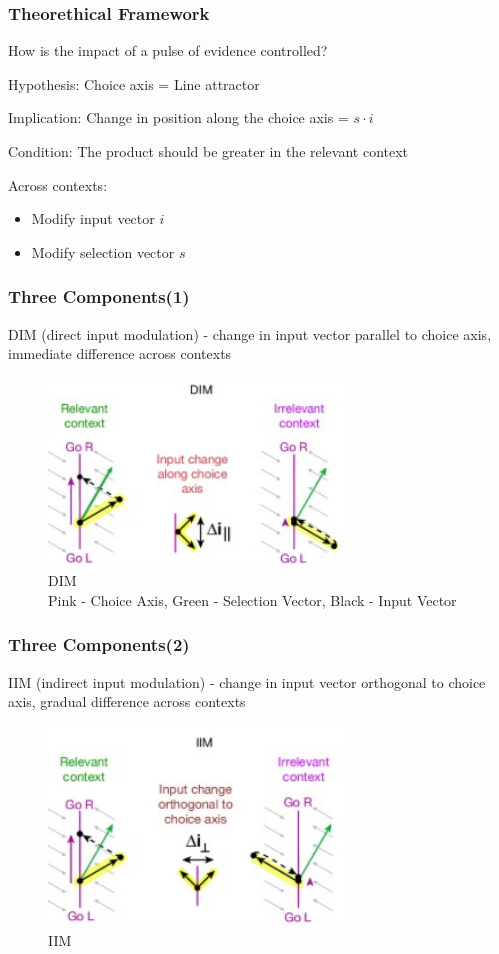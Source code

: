 \documentclass{beamer}
\begin{document}
\begin{frame}
\frametitle{Theorethical Framework}
How is the impact of a pulse of evidence controlled?

Hypothesis: Choice axis = Line attractor

Implication: Change in position along the choice axis = $s \cdot i$

Condition: The product should be greater in the relevant context

Across contexts:

\begin{itemize}
	\item Modify input vector $i$
	\item Modify selection vector $s$
\end{itemize}
\end{frame}

\begin{frame}
\frametitle{Three Components(1)}
DIM (direct input modulation) - change in input vector parallel to choice axis, immediate difference across contexts

\begin{figure}[h!]
	\centering
	\includegraphics[width=0.7\textwidth]{dim.jpg}
	\caption{DIM \\ Pink - Choice Axis, Green - Selection Vector, Black - Input Vector}
    \label{fig:dim}
\end{figure}
\end{frame}

\begin{frame}
\frametitle{Three Components(2)}
IIM (indirect input modulation) - change in input vector orthogonal to choice axis, gradual difference across contexts

\begin{figure}[h!]
	\centering
	\includegraphics[width=0.7\textwidth]{iim.jpg}
	\caption{IIM}
    \label{fig:iim}
\end{figure}
\end{frame}
\end{document}
